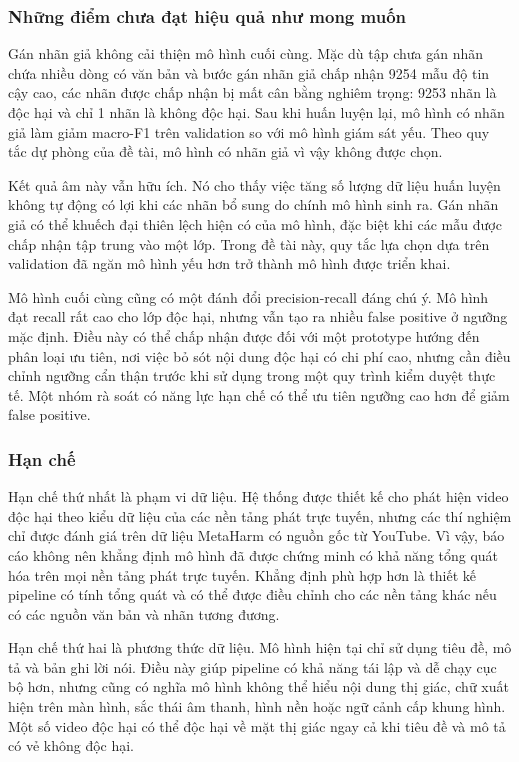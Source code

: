 \subsubsection{Những điểm chưa đạt hiệu quả như mong muốn}

Gán nhãn giả không cải thiện mô hình cuối cùng. Mặc dù tập chưa gán nhãn chứa nhiều dòng có văn bản và bước gán nhãn giả chấp nhận 9254 mẫu độ tin cậy cao, các nhãn được chấp nhận bị mất cân bằng nghiêm trọng: 9253 nhãn là độc hại và chỉ 1 nhãn là không độc hại. Sau khi huấn luyện lại, mô hình có nhãn giả làm giảm macro-F1 trên validation so với mô hình giám sát yếu. Theo quy tắc dự phòng của đề tài, mô hình có nhãn giả vì vậy không được chọn.

Kết quả âm này vẫn hữu ích. Nó cho thấy việc tăng số lượng dữ liệu huấn luyện không tự động có lợi khi các nhãn bổ sung do chính mô hình sinh ra. Gán nhãn giả có thể khuếch đại thiên lệch hiện có của mô hình, đặc biệt khi các mẫu được chấp nhận tập trung vào một lớp. Trong đề tài này, quy tắc lựa chọn dựa trên validation đã ngăn mô hình yếu hơn trở thành mô hình được triển khai.

Mô hình cuối cùng cũng có một đánh đổi precision-recall đáng chú ý. Mô hình đạt recall rất cao cho lớp độc hại, nhưng vẫn tạo ra nhiều false positive ở ngưỡng mặc định. Điều này có thể chấp nhận được đối với một prototype hướng đến phân loại ưu tiên, nơi việc bỏ sót nội dung độc hại có chi phí cao, nhưng cần điều chỉnh ngưỡng cẩn thận trước khi sử dụng trong một quy trình kiểm duyệt thực tế. Một nhóm rà soát có năng lực hạn chế có thể ưu tiên ngưỡng cao hơn để giảm false positive.

\subsubsection{Hạn chế}

Hạn chế thứ nhất là phạm vi dữ liệu. Hệ thống được thiết kế cho phát hiện video độc hại theo kiểu dữ liệu của các nền tảng phát trực tuyến, nhưng các thí nghiệm chỉ được đánh giá trên dữ liệu MetaHarm có nguồn gốc từ YouTube. Vì vậy, báo cáo không nên khẳng định mô hình đã được chứng minh có khả năng tổng quát hóa trên mọi nền tảng phát trực tuyến. Khẳng định phù hợp hơn là thiết kế pipeline có tính tổng quát và có thể được điều chỉnh cho các nền tảng khác nếu có các nguồn văn bản và nhãn tương đương.

Hạn chế thứ hai là phương thức dữ liệu. Mô hình hiện tại chỉ sử dụng tiêu đề, mô tả và bản ghi lời nói. Điều này giúp pipeline có khả năng tái lập và dễ chạy cục bộ hơn, nhưng cũng có nghĩa mô hình không thể hiểu nội dung thị giác, chữ xuất hiện trên màn hình, sắc thái âm thanh, hình nền hoặc ngữ cảnh cấp khung hình. Một số video độc hại có thể độc hại về mặt thị giác ngay cả khi tiêu đề và mô tả có vẻ không độc hại.

